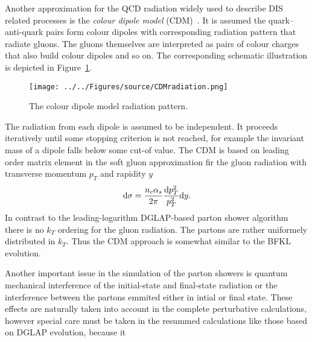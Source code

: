 Another approximation for the QCD radiation widely used to describe DIS related processes is the \emph{colour dipole model} (CDM)~\cite{cdm}. It is assumed the quark--anti-quark pairs form colour dipoles with corresponding radiation pattern that radiate gluons. The gluons themselves are interpreted as pairs of colour charges that also build colour dipoles and so on. The corresponding schematic illustration is depicted in Figure~\ref{fig:cdm}. 
\begin{figure}[t]%
\texttt{[image: ../../Figures/source/CDMradiation.png]}%
\caption{The colour dipole model radiation pattern.}%
\label{fig:cdm}%
\end{figure}
The radiation from each dipole is assumed to be independent. It proceeds iteratively until some stopping criterion is not reached, for example the invariant mass of a dipole falls below some cut-of  value. The CDM is based on leading order matrix element in the soft gluon approximation fir the gluon radiation with transverse momentum $p_T$ and rapidity $y$
\begin{equation}
\mathrm{d}\sigma = \frac{n_c\mbox{$\alpha_{s}$}}{2\pi}\frac{\mathrm{d}p_T^2}{p_T^2}\mathrm{d}y.
\end{equation}
In contrast to the leading-logarithm DGLAP-based parton shower algorithm there is no $k_T$ ordering for the gluon radiation. The partons are rather uniformely distributed in $k_T$. Thus the CDM approach is somewhat similar to the BFKL evolution.

Another important issue in the simulation of the parton showers is quantum mechanical interference of the initial-state and final-state radiation or the interference between the partons emmited either in intial or final state. These effects are naturally taken into account in the complete perturbative calculations, however special care must be taken in the resummed calculations like those based on DGLAP evolution, because it 

